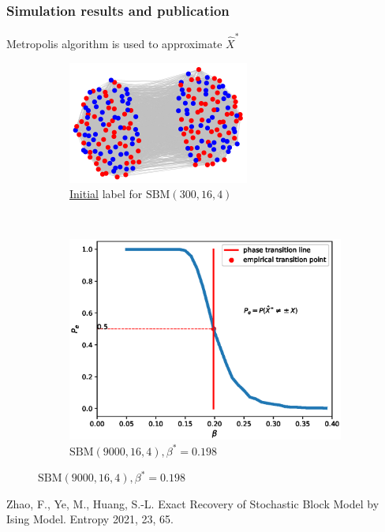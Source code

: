 \documentclass[notheorems]{beamer}
\begin{document}
	\begin{frame}
	\frametitle{Simulation results and publication}
	Metropolis algorithm is used to approximate $\hat{X}^*$
	
	\begin{figure}
		\centering
		\begin{subfigure}{0.45\textwidth}
			\includegraphics[width=\textwidth]{000.png}
			\caption{\href{run:./demo.mp4}{Initial} label for $\textrm{SBM}(300, 16, 4)$}
		\end{subfigure}~
		\begin{subfigure}{0.53\textwidth}
			\includegraphics[width=\textwidth]{beta_trans-2020-11-28.eps}
			\caption{$\textrm{SBM}(9000, 16, 4), \beta^*=0.198$}
		\end{subfigure}
	\end{figure}
	Zhao, F., Ye, M., Huang, S.-L. Exact Recovery of Stochastic Block Model by Ising Model. Entropy 2021, 23, 65.
	
\end{frame}
	
\end{document}
